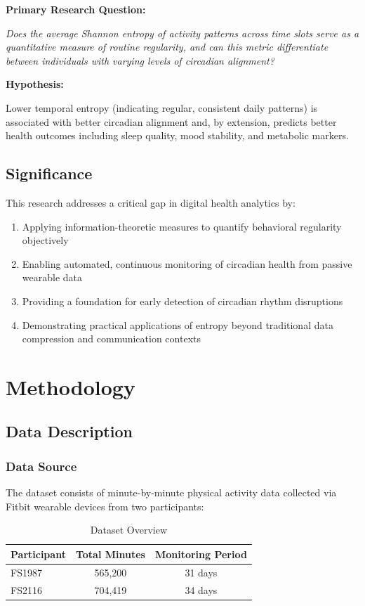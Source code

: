 \documentclass[12pt,letterpaper]{article}
\begin{document}
\textbf{Primary Research Question:}

\textit{Does the average Shannon entropy of activity patterns across time slots serve as a quantitative measure of routine regularity, and can this metric differentiate between individuals with varying levels of circadian alignment?}

\textbf{Hypothesis:}

Lower temporal entropy (indicating regular, consistent daily patterns) is associated with better circadian alignment and, by extension, predicts better health outcomes including sleep quality, mood stability, and metabolic markers.

\subsection{Significance}

This research addresses a critical gap in digital health analytics by:
\begin{enumerate}
    \item Applying information-theoretic measures to quantify behavioral regularity objectively
    \item Enabling automated, continuous monitoring of circadian health from passive wearable data
    \item Providing a foundation for early detection of circadian rhythm disruptions
    \item Demonstrating practical applications of entropy beyond traditional data compression and communication contexts
\end{enumerate}

\section{Methodology}

\subsection{Data Description}

\subsubsection{Data Source}

The dataset consists of minute-by-minute physical activity data collected via Fitbit wearable devices from two participants:

\begin{table}[H]
\centering
\caption{Dataset Overview}
\begin{tabular}{lcc}
\toprule
\textbf{Participant} & \textbf{Total Minutes} & \textbf{Monitoring Period} \\
\midrule
FS1987 & 565,200 & 31 days \\
FS2116 & 704,419 & 34 days \\
\bottomrule
\end{tabular}
\end{table}
\end{document}
